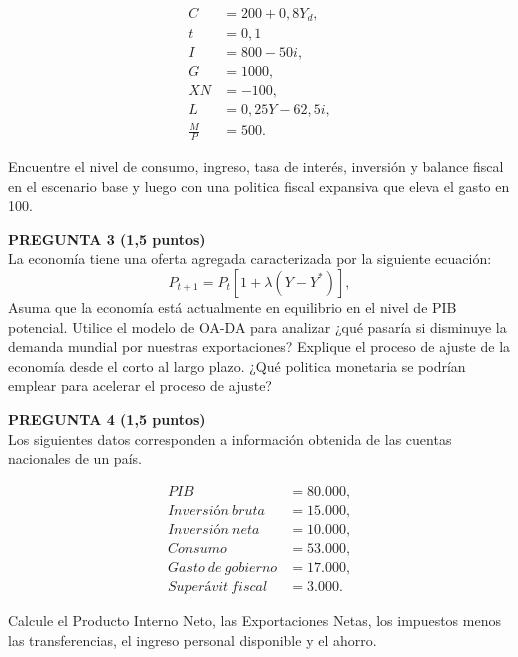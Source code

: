 \documentclass[11pt,addpoints]{article}
\begin{document}
\begin{align*}
C &= 200 + 0{,}8Y_d, \\
t&= 0{,}1 \\
I &= 800 - 50i, \\
G &= 1000, \\
XN &= -100 , \\
L &= 0{,}25Y - 62{,}5i, \\
\frac{M}{P} &= 500.
\end{align*}

Encuentre el nivel de consumo, ingreso, tasa de interés, inversión y balance fiscal en el escenario base y luego con una politica fiscal expansiva que eleva el gasto en 100.


\vspace{0.4cm}

\textbf{PREGUNTA 3 (1,5 puntos)}\\[0.2cm]
La economía tiene una oferta agregada caracterizada por la siguiente ecuación:
\[
P_{t+1} = P_{t}\left[1 + \lambda (Y - Y^*)\right],
\]
Asuma que la economía está actualmente en equilibrio en el nivel de PIB potencial. Utilice el modelo de OA-DA para analizar ¿qué pasaría si disminuye la demanda mundial por nuestras exportaciones? Explique el proceso de ajuste de la economía desde el corto al largo plazo. ¿Qué politica monetaria se podrían emplear para acelerar el proceso de ajuste?

\newpage
\vspace*{0.5cm}
\textbf{PREGUNTA 4 (1,5 puntos)}\\[0.2cm]
Los siguientes datos corresponden a información obtenida de las cuentas nacionales de un país.

\begin{align*}
PIB &= 80{.}000, \\
Inversión\ bruta &= 15{.}000, \\
Inversión\ neta &= 10{.}000, \\
Consumo &= 53{.}000, \\
Gasto\ de\ gobierno &= 17{.}000, \\
Superávit\ fiscal &= 3{.}000.
\end{align*}

Calcule el Producto Interno Neto, las Exportaciones Netas, los impuestos menos las transferencias, el ingreso personal disponible y el ahorro.
\end{document}
